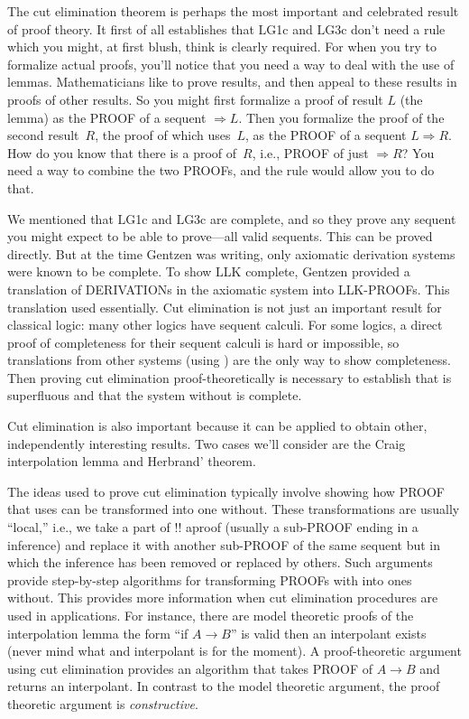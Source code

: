 \documentclass[10pt,a4paper]{article}
\newcommand*{\olup}[1]{\MakeUppercase{#1}}
\theoremstyle{plain}
\theoremstyle{definition}
\theoremstyle{remark}
\providecommand{\lif}{\mathbin{\rightarrow}}
\providecommand{\Sequent}{\mathrel{\Rightarrow}}
\providecommand{\Log}{\ensuremath{\mathrm{L}}}
\providecommand{\Cut}{\mathrm{Cut}}
\begin{document}
The cut elimination theorem is perhaps the most important and
celebrated result of proof theory. It first of all establishes that
\Log{G1c} and \Log{G3c} don't need a rule which you might, at first
blush, think is clearly required. For when you try to formalize actual
proofs, you'll notice that you need a way to deal with the use of
lemmas. Mathematicians like to prove results, and then appeal to these
results in proofs of other results. So you might first formalize a
proof of result $L$ (the lemma) as the \olup{proof} of a sequent
$\Sequent L$. Then you formalize the proof of the second result~$R$,
the proof of which uses~$L$, as the \olup{proof} of a sequent $L \Sequent
R$. How do you know that there is a proof of~$R$, i.e., \olup{proof} of
just $\Sequent R$? You need a way to combine the two \olup{proof}s, and
the \Cut{} rule would allow you to do that.

We mentioned that \Log{G1c} and \Log{G3c} are complete, and so they
prove any sequent you might expect to be able to prove---all valid
sequents. This can be proved directly. But at the time Gentzen was
writing, only axiomatic derivation systems were known to be complete.
To show \Log{LK} complete, Gentzen provided a translation of
\olup{derivation}s in the axiomatic system into \Log{LK}-\olup{proof}s. This
translation used \Cut{} essentially. Cut elimination is not just an
important result for classical logic: many other logics have sequent
calculi. For some logics, a direct proof of completeness for their
sequent calculi is hard or impossible, so translations from other
systems (using \Cut) are the only way to show completeness. Then
proving cut elimination proof-theoretically is necessary to establish
that \Cut{} is superfluous and that the system without \Cut{} is
complete.

Cut elimination is also important because it can be applied to obtain
other, independently interesting results. Two cases we'll consider are
the Craig interpolation lemma and Herbrand' theorem.

The ideas used to prove cut elimination typically involve showing how
\olup{proof} that uses \Cut{} can be transformed into one without. These
transformations are usually ``local,'' i.e., we take a part of !!
a{proof} (usually a sub-\olup{proof} ending in a \Cut{} inference) and
replace it with another sub-\olup{proof} of the same sequent but in which
the \Cut{} inference has been removed or replaced by others. Such
arguments provide step-by-step algorithms for transforming \olup{proof}s
with \Cut{} into ones without. This provides more information when cut
elimination procedures are used in applications. For instance, there
are model theoretic proofs of the interpolation lemma the form ``if
$A \lif B$'' is valid then an interpolant exists (never mind what
and interpolant is for the moment). A proof-theoretic argument using
cut elimination provides an algorithm that takes \olup{proof} of $A
\lif B$ and returns an interpolant. In contrast to the model
theoretic argument, the proof theoretic argument is
\emph{constructive}.
\end{document}
